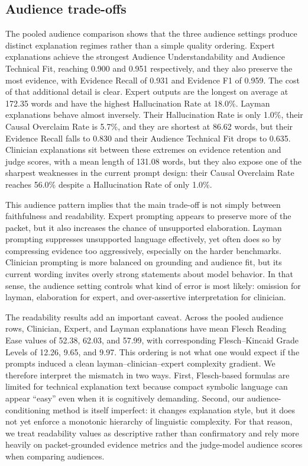 \documentclass[sigconf,nonacm]{acmart}
\begin{document}
\subsection{Audience trade-offs}
The pooled audience comparison shows that the three audience settings produce distinct explanation regimes rather than a simple quality ordering. Expert explanations achieve the strongest Audience Understandability and Audience Technical Fit, reaching 0.900 and 0.951 respectively, and they also preserve the most evidence, with Evidence Recall of 0.931 and Evidence F1 of 0.959. The cost of that additional detail is clear. Expert outputs are the longest on average at 172.35 words and have the highest Hallucination Rate at 18.0\%. Layman explanations behave almost inversely. Their Hallucination Rate is only 1.0\%, their Causal Overclaim Rate is 5.7\%, and they are shortest at 86.62 words, but their Evidence Recall falls to 0.830 and their Audience Technical Fit drops to 0.635. Clinician explanations sit between these extremes on evidence retention and judge scores, with a mean length of 131.08 words, but they also expose one of the sharpest weaknesses in the current prompt design: their Causal Overclaim Rate reaches 56.0\% despite a Hallucination Rate of only 1.0\%.

This audience pattern implies that the main trade-off is not simply between faithfulness and readability. Expert prompting appears to preserve more of the packet, but it also increases the chance of unsupported elaboration. Layman prompting suppresses unsupported language effectively, yet often does so by compressing evidence too aggressively, especially on the harder benchmarks. Clinician prompting is more balanced on grounding and audience fit, but its current wording invites overly strong statements about model behavior. In that sense, the audience setting controls what kind of error is most likely: omission for layman, elaboration for expert, and over-assertive interpretation for clinician.

The readability results add an important caveat. Across the pooled audience rows, Clinician, Expert, and Layman explanations have mean Flesch Reading Ease values of 52.38, 62.03, and 57.99, with corresponding Flesch--Kincaid Grade Levels of 12.26, 9.65, and 9.97. This ordering is not what one would expect if the prompts induced a clean layman--clinician--expert complexity gradient. We therefore interpret the mismatch in two ways. First, Flesch-based formulas are limited for technical explanation text because compact symbolic language can appear ``easy'' even when it is cognitively demanding. Second, our audience-conditioning method is itself imperfect: it changes explanation style, but it does not yet enforce a monotonic hierarchy of linguistic complexity. For that reason, we treat readability values as descriptive rather than confirmatory and rely more heavily on packet-grounded evidence metrics and the judge-model audience scores when comparing audiences.
\end{document}
